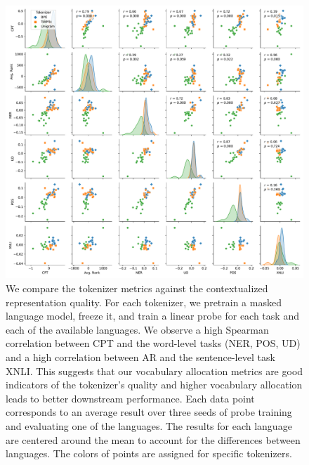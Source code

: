




\begin{figure}
    \centering
    \includegraphics[width=\textwidth]{figures/pair_analysis_20L.pdf}
    \caption{We compare the tokenizer metrics against the contextualized representation quality. For each tokenizer, we pretrain a masked language model, freeze it, and train a linear probe for each task and each of the available languages. We observe a high Spearman correlation between CPT and the word-level tasks (NER, POS, UD) and a high correlation between AR and the sentence-level task XNLI. This suggests that our vocabulary allocation metrics are good indicators of the tokenizer's quality and higher vocabulary allocation leads to better downstream performance. Each data point corresponds to an average result over three seeds of probe training and evaluating one of the languages. The results for each language are centered around the mean to account for the differences between languages. The colors of points are assigned for specific tokenizers.}
    \label{fig:pair_analysis_20L}
\end{figure}

